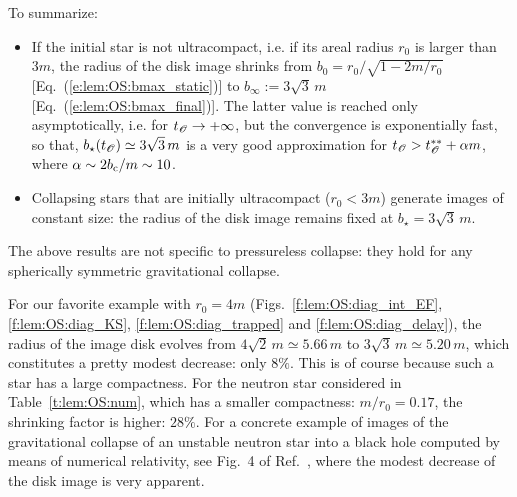 To summarize:

\begin{prop}
\begin{itemize}
\item If the initial star is not ultracompact, i.e. if its areal radius
$r_0$ is larger than $3 m$,
the radius of the disk image shrinks from $b_0 = r_0 / \sqrt{1 - 2m/r_0}$
[Eq.~(\ref{e:lem:OS:bmax_static})]
to $b_\infty := 3\sqrt{3} \, m$ [Eq.~(\ref{e:lem:OS:bmax_final})].
The latter value is reached only asymptotically, i.e. for $t_{\mathscr{O}}\to +\infty$,
but the convergence is exponentially fast, so that, $b_\star(t_{\mathscr{O}}) \simeq 3\sqrt{3} \, m$
is a very good approximation for $t_{\mathscr{O}} > t_{\mathscr{O}}^{**} + \alpha m$, where $\alpha \sim 2 b_{\rm c}/m
\sim 10 $.
\item Collapsing stars that are initially ultracompact
($r_0 < 3 m$) generate images of constant size: the radius of the disk image
remains fixed at $b_\star = 3\sqrt{3} \, m$.
\end{itemize}
\end{prop}

\begin{remark}
The above results are not specific to pressureless collapse: they
hold for any spherically symmetric gravitational collapse.
\end{remark}

\begin{example}
For our favorite example with $r_0 = 4m$ (Figs.~\ref{f:lem:OS:diag_int_EF},
\ref{f:lem:OS:diag_KS}, \ref{f:lem:OS:diag_trapped} and \ref{f:lem:OS:diag_delay}),
the radius of the image disk evolves from $4\sqrt{2} \, m\simeq 5.66\, m$ to
$3\sqrt{3}\, m \simeq 5.20\, m$, which constitutes a pretty modest
decrease: only $8\%$. This is of course because such a star has a large compactness.
For the neutron star considered in Table~\ref{t:lem:OS:num}, which has a
smaller compactness: $m/r_0 = 0.17$, the shrinking factor is higher: $28\%$.
For a concrete example of images of the gravitational collapse of an unstable neutron star into a black hole computed by means of numerical relativity, see
Fig.~4 of Ref.~\cite{VinceGN12}, where the modest decrease of the disk image
is very apparent.
\end{example}

